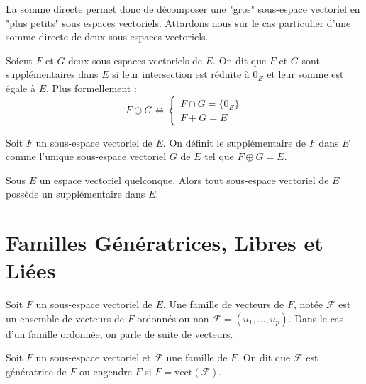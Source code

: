La somme directe permet donc de décomposer une "gros" sous-espace vectoriel en "plus petits" sous espaces vectoriels. 
Attardons nous sur le cas particulier d'une somme directe de deux sous-espaces vectoriels. 

\begin{remark}
    Soient $F$ et $G$ deux sous-espaces vectoriels de $E$. On dit que $F$ et $G$ sont supplémentaires dans $E$ si 
    leur intersection est réduite à $0_E$ et leur somme est égale à $E$. 
    Plus formellement : 
        \[ F \oplus G \iff 
            \begin{cases}
                F \cap G = \{0_E\} \\ 
                F + G = E 
            \end{cases} \] 
\end{remark}

\begin{definition}[Supplémentaire]
    Soit $F$ un sous-espace vectoriel de $E$. On définit le supplémentaire de $F$ dans $E$ comme l'unique 
    sous-espace vectoriel $G$ de $E$ tel que $ F \oplus G = E$. 
\end{definition}

\begin{prop}[Existence]
    Sous $E$ un espace vectoriel quelconque. 
    Alors tout sous-espace vectoriel de $E$ possède un supplémentaire dans $E$. 
\end{prop}


\section{Familles Génératrices, Libres et Liées}

\begin{definition}[Famille]
    Soit $F$ un sous-espace vectoriel de $E$. 
    Une famille de vecteurs de $F$, notée $ \mathcal{F}$ est un ensemble de vecteurs de $F$ ordonnés ou non 
    $ \mathcal{F} = (u_1, \dots, u_p)$. 
    Dans le cas d'un famille ordonnée, on parle de suite de vecteurs.
\end{definition}

\begin{definition}
    Soit $F$ un sous-espace vectoriel et $ \mathcal{F}$ une famille de $F$. 
    On dit que $ \mathcal{F} $ est génératrice de $F$ ou engendre $F$ si $F = \text{vect}(\mathcal{F})$. 
\end{definition}

